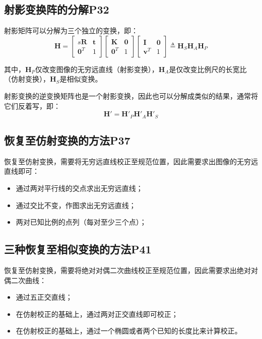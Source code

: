 \documentclass[11pt]{article}
\begin{document}
\subsection{	射影变换阵的分解P32}
射影矩阵可以分解为三个独立的变换，即：
\begin{equation*}
  \mathbold{H}=\begin{bmatrix}
    s\mathbold{R}  & \mathbold{t} \\
    \mathbold{0}^T & 1
  \end{bmatrix}
  \begin{bmatrix}
    \mathbold{K}   & \mathbold{0} \\
    \mathbold{0}^T & 1
  \end{bmatrix}
  \begin{bmatrix}
    \mathbold{I}   & \mathbold{0} \\
    \mathbold{v}^T & 1
  \end{bmatrix}
  \triangleq\mathbold{H}_S\mathbold{H}_A\mathbold{H}_P
\end{equation*}\par
其中，$\mathbold{H}_P$仅改变图像的无穷远直线（射影变换），$\mathbold{H}_A$是仅改变比例尺的长宽比（仿射变换），$\mathbold{H}_S$是相似变换。\par
射影变换的逆变换矩阵也是一个射影变换，因此也可以分解成类似的结果，通常将它们反着写，即：
\begin{equation*}
  \mathbold{H}'=\mathbold{H}'_P\mathbold{H}'_A\mathbold{H}'_S
\end{equation*}\par
\subsection{恢复至仿射变换的方法P37}
恢复至仿射变换，需要将无穷远直线校正至规范位置，因此需要求出图像的无穷远直线即可：
\begin{itemize}
  \item 通过两对平行线的交点求出无穷远直线；
  \item 通过交比不变，作图求出无穷远直线；
  \item 两对已知比例的点列（每对至少三个点）；
\end{itemize}
\subsection{三种恢复至相似变换的方法P41}
恢复至仿射变换，需要将绝对对偶二次曲线校正至规范位置，因此需要求出绝对对偶二次曲线：
\begin{itemize}
  \item 通过五正交直线；
  \item 在仿射校正的基础上，通过两对正交直线即可校正；
  \item 在仿射校正的基础上，通过一个椭圆或者两个已知的长度比来计算校正。
\end{itemize}
\end{document}
